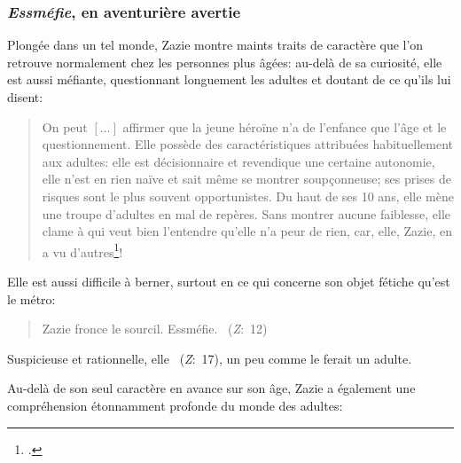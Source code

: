 \subsubsection{\textit{Essméfie}, en aventurière avertie}
Plongée dans un tel monde, Zazie montre maints traits de caractère que l'on retrouve normalement chez les personnes plus âgées: au-delà de sa curiosité, elle est aussi méfiante, questionnant longuement les adultes et doutant de ce qu'ils lui disent:
\begin{quote}
  \begin{singlespace}
    \small
    On peut $\left[ \dots \right]$ affirmer que la jeune héroïne n'a de l'enfance que l'âge et le questionnement. Elle possède des caractéristiques attribuées habituellement aux adultes: elle est décisionnaire et revendique une certaine autonomie, elle n'est en rien naïve et sait même se montrer soupçonneuse; ses prises de risques sont le plus souvent opportunistes. Du haut de ses 10 ans, elle mène une troupe d'adultes en mal de repères. Sans montrer aucune faiblesse, elle clame à qui veut bien l'entendre qu'elle n'a peur de rien, car, elle, Zazie, en a vu d'autres\footcite[88]{Maurin2007}!
    \normalsize
  \end{singlespace}
\end{quote}
Elle est aussi difficile à berner, surtout en ce qui concerne son objet fétiche qu'est le métro:
\begin{quote}
  \begin{singlespace}
    \small
    Zazie fronce le sourcil. Essméfie.
     ~(\textit{Z}:~12)
    \normalsize
  \end{singlespace}
\end{quote}
Suspicieuse et rationnelle, elle ~(\textit{Z}:~17), un peu comme le ferait un adulte.
\par
Au-delà de son seul caractère en avance sur son âge, Zazie a également une compréhension étonnamment profonde du monde des adultes: 
